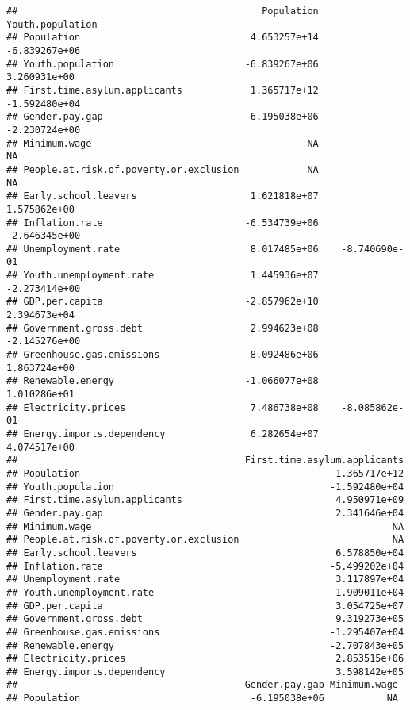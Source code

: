 \documentclass[
]{article}
\begin{document}
\begin{verbatim}
##                                           Population Youth.population
## Population                              4.653257e+14    -6.839267e+06
## Youth.population                       -6.839267e+06     3.260931e+00
## First.time.asylum.applicants            1.365717e+12    -1.592480e+04
## Gender.pay.gap                         -6.195038e+06    -2.230724e+00
## Minimum.wage                                      NA               NA
## People.at.risk.of.poverty.or.exclusion            NA               NA
## Early.school.leavers                    1.621818e+07     1.575862e+00
## Inflation.rate                         -6.534739e+06    -2.646345e+00
## Unemployment.rate                       8.017485e+06    -8.740690e-01
## Youth.unemployment.rate                 1.445936e+07    -2.273414e+00
## GDP.per.capita                         -2.857962e+10     2.394673e+04
## Government.gross.debt                   2.994623e+08    -2.145276e+00
## Greenhouse.gas.emissions               -8.092486e+06     1.863724e+00
## Renewable.energy                       -1.066077e+08     1.010286e+01
## Electricity.prices                      7.486738e+08    -8.085862e-01
## Energy.imports.dependency               6.282654e+07     4.074517e+00
##                                        First.time.asylum.applicants
## Population                                             1.365717e+12
## Youth.population                                      -1.592480e+04
## First.time.asylum.applicants                           4.950971e+09
## Gender.pay.gap                                         2.341646e+04
## Minimum.wage                                                     NA
## People.at.risk.of.poverty.or.exclusion                           NA
## Early.school.leavers                                   6.578850e+04
## Inflation.rate                                        -5.499202e+04
## Unemployment.rate                                      3.117897e+04
## Youth.unemployment.rate                                1.909011e+04
## GDP.per.capita                                         3.054725e+07
## Government.gross.debt                                  9.319273e+05
## Greenhouse.gas.emissions                              -1.295407e+04
## Renewable.energy                                      -2.707843e+05
## Electricity.prices                                     2.853515e+06
## Energy.imports.dependency                              3.598142e+05
##                                        Gender.pay.gap Minimum.wage
## Population                              -6.195038e+06           NA

\end{verbatim}
\end{document}
